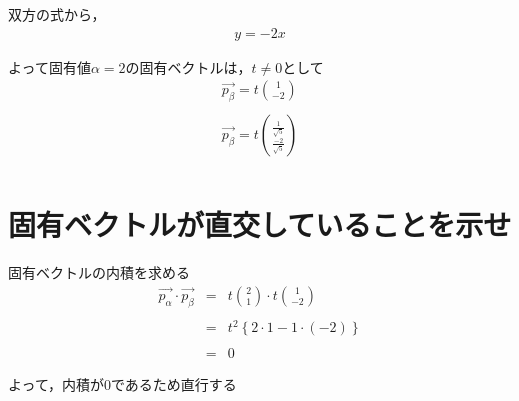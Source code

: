 \documentclass[dvipdfmx,autodetect-engine,titlepage]{jsarticle}
\begin{document}
双方の式から，\begin{eqnarray*}
  y= -2 x
\end{eqnarray*}

よって固有値\begin{math}
  \alpha = 2
\end{math}の固有ベクトルは，\begin{math}
  t \neq 0
\end{math}として
\begin{eqnarray*}
  \overrightarrow{p_{\beta }} = t \binom{1} {-2} \\\\
  \overrightarrow{p_{\beta }} = t \binom{\frac{1}{\sqrt{5} } }{\frac{-2}{\sqrt{5}} } \\
\end{eqnarray*}


\section{固有ベクトルが直交していることを示せ}
固有ベクトルの内積を求める
\begin{eqnarray*}
  \overrightarrow{p_{\alpha }} \cdot \overrightarrow{p_{\beta }}
  &=& t \binom{2}{1}\cdot t \binom{1}{-2} \\\\
  &=& t^2 \left\{2 \cdot 1 - 1 \cdot (-2) \right\} \\\\
  &=& 0
\end{eqnarray*}

よって，内積が0であるため直行する
\end{document}
